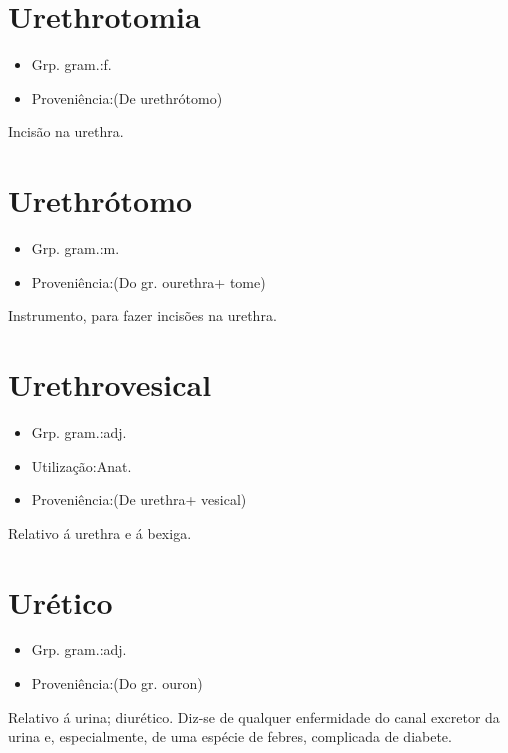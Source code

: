 \documentclass{article}
\begin{document}
\section{Urethrotomia}
\begin{itemize}
\item {Grp. gram.:f.}
\end{itemize}
\begin{itemize}
\item {Proveniência:(De \textunderscore urethrótomo\textunderscore )}
\end{itemize}
Incisão na urethra.
\section{Urethrótomo}
\begin{itemize}
\item {Grp. gram.:m.}
\end{itemize}
\begin{itemize}
\item {Proveniência:(Do gr. \textunderscore ourethra\textunderscore  + \textunderscore tome\textunderscore )}
\end{itemize}
Instrumento, para fazer incisões na urethra.
\section{Urethrovesical}
\begin{itemize}
\item {Grp. gram.:adj.}
\end{itemize}
\begin{itemize}
\item {Utilização:Anat.}
\end{itemize}
\begin{itemize}
\item {Proveniência:(De \textunderscore urethra\textunderscore  + \textunderscore vesical\textunderscore )}
\end{itemize}
Relativo á urethra e á bexiga.
\section{Urético}
\begin{itemize}
\item {Grp. gram.:adj.}
\end{itemize}
\begin{itemize}
\item {Proveniência:(Do gr. \textunderscore ouron\textunderscore )}
\end{itemize}
Relativo á urina; diurético.
Diz-se de qualquer enfermidade do canal excretor da urina e, especialmente, de uma espécie de febres, complicada de diabete.
\end{document}
